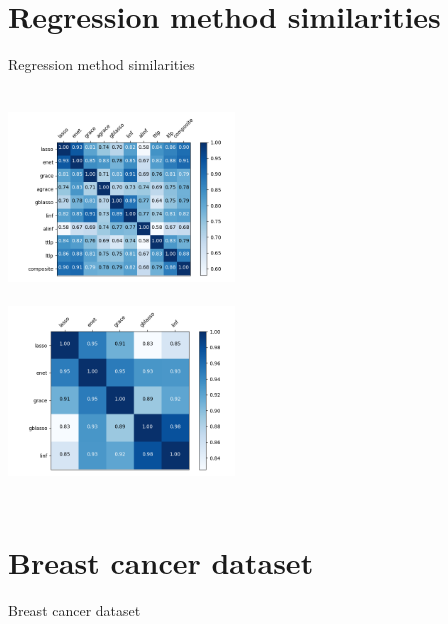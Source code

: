 \documentclass{beamer}
\begin{document}
\section{Regression method similarities}
\begin{frame}{Regression method similarities}
\begin{columns}[t]
	\centering
	\includegraphics[width=6cm,height=5cm]{cv_mse_similarities}\\
	\centering
	\includegraphics[width=6cm,height=5cm]{orchestrated_similarities}\\
\end{columns}
\end{frame}





\section{Breast cancer dataset}
\begin{frame}{Breast cancer dataset}
\end{frame}
\end{document}

